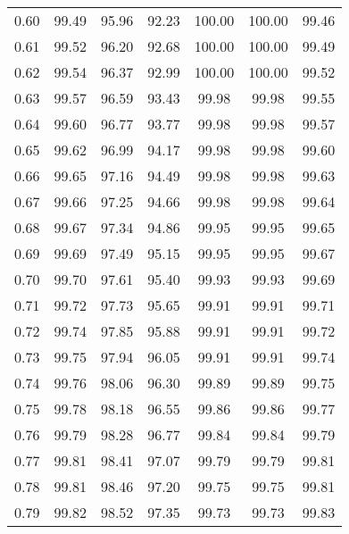 \begin{tabular}{|c|c|c|c|c|c|c|}
      0.60 &     99.49 &     95.96 &      92.23 &  100.00 &     100.00 &         99.46 \\
      0.61 &     99.52 &     96.20 &      92.68 &  100.00 &     100.00 &         99.49 \\
      0.62 &     99.54 &     96.37 &      92.99 &  100.00 &     100.00 &         99.52 \\
      0.63 &     99.57 &     96.59 &      93.43 &   99.98 &      99.98 &         99.55 \\
      0.64 &     99.60 &     96.77 &      93.77 &   99.98 &      99.98 &         99.57 \\
      0.65 &     99.62 &     96.99 &      94.17 &   99.98 &      99.98 &         99.60 \\
      0.66 &     99.65 &     97.16 &      94.49 &   99.98 &      99.98 &         99.63 \\
      0.67 &     99.66 &     97.25 &      94.66 &   99.98 &      99.98 &         99.64 \\
      0.68 &     99.67 &     97.34 &      94.86 &   99.95 &      99.95 &         99.65 \\
      0.69 &     99.69 &     97.49 &      95.15 &   99.95 &      99.95 &         99.67 \\
      0.70 &     99.70 &     97.61 &      95.40 &   99.93 &      99.93 &         99.69 \\
      0.71 &     99.72 &     97.73 &      95.65 &   99.91 &      99.91 &         99.71 \\
      0.72 &     99.74 &     97.85 &      95.88 &   99.91 &      99.91 &         99.72 \\
      0.73 &     99.75 &     97.94 &      96.05 &   99.91 &      99.91 &         99.74 \\
      0.74 &     99.76 &     98.06 &      96.30 &   99.89 &      99.89 &         99.75 \\
      0.75 &     99.78 &     98.18 &      96.55 &   99.86 &      99.86 &         99.77 \\
      0.76 &     99.79 &     98.28 &      96.77 &   99.84 &      99.84 &         99.79 \\
      0.77 &     99.81 &     98.41 &      97.07 &   99.79 &      99.79 &         99.81 \\
      0.78 &     99.81 &     98.46 &      97.20 &   99.75 &      99.75 &         99.81 \\
      0.79 &     99.82 &     98.52 &      97.35 &   99.73 &      99.73 &         99.83 \\

\end{tabular}
